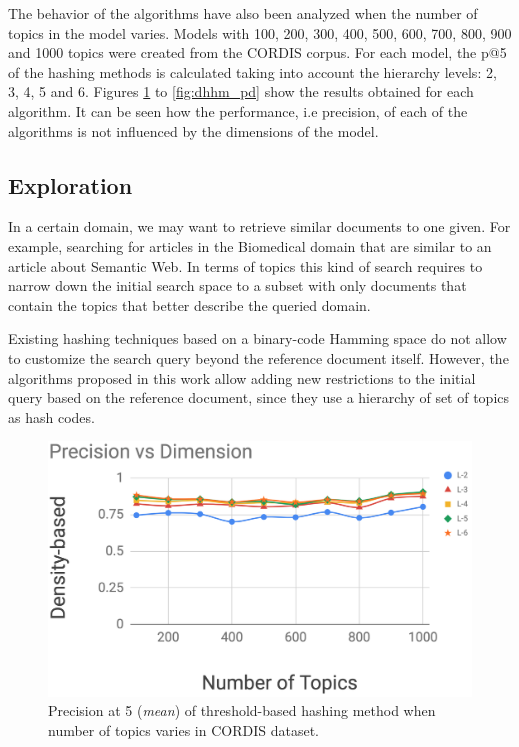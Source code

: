 The behavior of the algorithms have also been analyzed when the number of topics in the model varies. Models with 100, 200, 300, 400, 500, 600, 700, 800, 900 and 1000 topics were created from the CORDIS corpus. For each model, the p@5 of the hashing methods is calculated taking into account the hierarchy levels: 2, 3, 4, 5 and 6. Figures \ref{fig:thhm_pd} to \ref{fig:dhhm_pd} show the results obtained for each algorithm. It can be seen how the performance, i.e precision, of each of the algorithms is not influenced by the dimensions of the model.

\subsection{Exploration}
\label{sec:comparison-exploration}

In a certain domain, we may want to retrieve similar documents to one given. For example, searching for articles in the Biomedical domain that are similar to an article about Semantic Web. In terms of topics this kind of search requires to narrow down the initial search space to a subset with only documents that contain the topics that better describe the queried domain.

Existing hashing techniques based on a binary-code Hamming space do not allow to customize the search query beyond the reference document itself. However, the algorithms proposed in this work allow adding new restrictions to the initial query based on the reference document, since they use a hierarchy of set of topics as hash codes.

\begin{figure}[t]\centering
\includegraphics[scale=0.25]{dhhm-pd.png}
\caption{Precision at 5 (\textit{mean}) of threshold-based hashing method when number of topics varies in CORDIS dataset.}
\label{fig:thhm_pd}
\end{figure}

